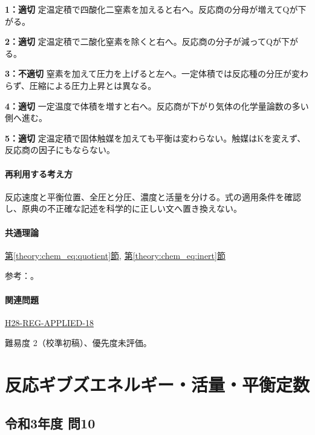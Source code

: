 \noindent\textbf{1：適切} 定温定積で四酸化二窒素を加えると右へ。反応商の分母が増えてQが下がる。\par

\noindent\textbf{2：適切} 定温定積で二酸化窒素を除くと右へ。反応商の分子が減ってQが下がる。\par

\noindent\textbf{3：不適切} 窒素を加えて圧力を上げると左へ。一定体積では反応種の分圧が変わらず、圧縮による圧力上昇とは異なる。\par

\noindent\textbf{4：適切} 一定温度で体積を増すと右へ。反応商が下がり気体の化学量論数の多い側へ進む。\par

\noindent\textbf{5：適切} 定温定積で固体触媒を加えても平衡は変わらない。触媒はKを変えず、反応商の因子にもならない。\par

\paragraph{再利用する考え方} 反応速度と平衡位置、全圧と分圧、濃度と活量を分ける。式の適用条件を確認し、原典の不正確な記述を科学的に正しい文へ置き換えない。

\paragraph{共通理論} \hyperref[theory:chem_eq:quotient]{第\ref*{theory:chem_eq:quotient}節}, \hyperref[theory:chem_eq:inert]{第\ref*{theory:chem_eq:inert}節}

\par 参考：\cite{iupac_greenbook2012}。

\paragraph{関連問題} \hyperref[q:h28-reg-applied-18]{H28-REG-APPLIED-18}

\par 難易度 2（校準初稿）、優先度未評価。

\section{反応ギブズエネルギー・活量・平衡定数}

\subsection{令和3年度 問10}
\label{q:r03-reg-applied-10}

